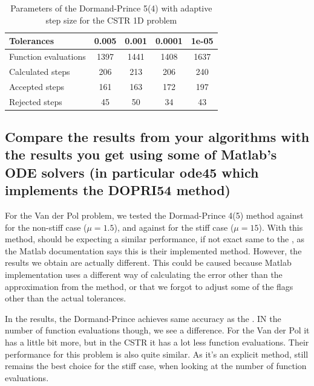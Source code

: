 \begin{table}[H]
    \centering
    \begin{tabular}{@{}l|cccc@{}}
    \toprule
    Tolerances           & 0.005 & 0.001 & 0.0001 & 1e-05 \\ \midrule
    Function evaluations & 1397  & 1441  & 1408   & 1637  \\
    Calculated steps     & 206   & 213   & 206    & 240   \\
    Accepted steps       & 161   & 163   & 172    & 197   \\
    Rejected steps       & 45    & 50    & 34     & 43    \\ \bottomrule
    \end{tabular}
    \caption{Parameters of the Dormand-Prince 5(4) with adaptive step size for the CSTR 1D problem}
    \label{7_5_1D_tols_table}
\end{table}

\subsection{Compare the results from your algorithms with the results you get using some of Matlab's ODE solvers (in particular ode45 which implements the DOPRI54 method)}

For the Van der Pol problem, we tested the Dormad-Prince 4(5) method against  for the non-stiff case ($\mu = 1.5$), and against  for the stiff case ($\mu = 15$). With this method, should be expecting a similar performance, if not exact same to the , as the Matlab documentation says this is their implemented method. However, the results we obtain are actually different. This could be caused because Matlab implementation uses a different way of calculating the error other than the approximation from the method, or that we forgot to adjust some of the flags other than the actual tolerances. 

In the results, the Dormand-Prince achieves same accuracy as the . IN the number of function evaluations though, we see a difference. For the Van der Pol it has a little bit more, but in the CSTR it has a lot less function evaluations. Their performance for this problem is also quite similar. As it's an explicit method,  still remains the best choice for the stiff case, when looking at the number of function evaluations.

